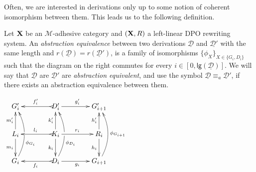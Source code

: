 \documentclass[a4paper,UKenglish,cleveref,pdftex,thm-restate,numberwithinsect,anonymous]{lipics}
\newcommand{\Deltamin}{\Delta^{\hspace{-1pt}\downarrow\hspace{-1pt}}}
\def\R{\mathsf{R}}
\def\X{\textbf {\textup{X}}}
\def\G{\textbf {\textup{G}}}
\newcommand{\dder}[1]{\mathscr{#1}}
\newcommand{\der}[1]{\underline{\dder{#1}}}
\newcommand{\lgh}[0]{\mathsf{lg}}
\newtheorem*{notation}{Notation}
\newcommand{\rem}[2]{{\color{blue}#1}{\color{red}#2}}
\renewcommand{\rem}[2]{}
\begin{document}
\rem{Suppongo questo serva quando poi si considerano le permutazioni consistenti, spostare? }{
\begin{remark}
  \label{rem:func}
  Consider a derivation $\der{D}$ in a left-linear DPO rewriting
  system $(\X, \R)$. We can take the subcategory $\Delta(\der{D})$ of
  $\X$ given by the arrows appearing in $\der{D}$. This subcategory
  comes equipped with an inclusion functor
  $I(\der{D})\colon \Delta(\der{D})\to \X$. Moreover, we can further
  define $\Deltamin(\der{D})$ as the subcategory of $\Delta(\der{D})$
  containing only the bottom row of the derivation.\todo{Used?}
\end{remark} 

\noindent
\parbox{10cm}{%
  \begin{notation}
    Let $\der{D}=\{\dder{D}_i\}_{i=0}^n$ be a derivation. We will
    depict the $i^\text{th}$ element $\dder{D}_i$ of $\der{D}$ as in
    the diagram on the right. Notice that, in particular, if $\der{D}$
    is a derivation between $G$ and $H$, then $G_0=G$ and
    $G_{n+1}=H$. When $\der{D}$ has length $1$ we will suppress the
    indexes. In such case, we will also identify $\der{D}$ with its
    only element.
  \end{notation} }
\parbox{3cm}{
  $\xymatrix{L_i \ar[d]_{m_i}& K_i
    \ar[d]^{k_i}\ar@{>->}[l]_{l_i} \ar[r]^{r_i} & R_i \ar[d]^{h_i}\\
    G_{i} & \ar@{>->}[l]^{f_{i}} D_{i} \ar[r]_{g_{i}}& G_{i+1} }$
}
}

Often, we are interested in derivations only up to some notion of coherent isomorphism between them. This leads us to the following definition. 

\noindent
\parbox{8cm}{
  \begin{definition}
    Let  $\X$ be an $\mathcal{M}$-adhesive category and 
    $(\X, \R)$ a left-linear DPO rewriting system. 
    An \emph{abstraction equivalence} between two derivations $\der{D}$
    and $\der{D'}$ with the same length and
    $r(\der{D})=r(\der{D}')$, is a family of isomorphisms
    $\{\phi_X\}_{X\in \{G_i,D_i\}}$ such that the diagram on the right commutes
    for every $i\in [0, \lgh(\der{D})]$. We
    will say that $\der{D}$ are $\der{D}'$ are \emph{abstraction
      equivalent}, and use the symbol $\der{D}\equiv_a \der{D}'$, if there exists an abstraction equivalence between
    them.
  \end{definition}
}
\parbox{4cm}{\vspace{-1.35em}$\xymatrix@C=40pt{G'_i&D'_i \ar[r]^{g'_i}
    \ar@{>->}[l]_{f'_i}&G'_{i+1}\\ L_i \ar[u]^{m'_i} \ar[d]_{m_i}& K_i
    \ar[u]^{k'_i} \ar[d]_{k_i} \ar[r]^{r_i} \ar@{>->}[l]_{l_i}
    &R_i \ar[u]^{h'_i} \ar[d]_{h_i}\\G_i
    \ar@/_.45cm/[uu]_(.35){\phi_{G_i}}|\hole&D_i\ar@{>->}[l]^{f_i}\ar@/_.45cm/[uu]_(.35){\phi_{D_i}}|\hole
    \ar[r]_{g_i}&G_{i+1}\ar@/_.45cm/[uu]_{\phi_{G_{i+1}}}}$}
\end{document}
